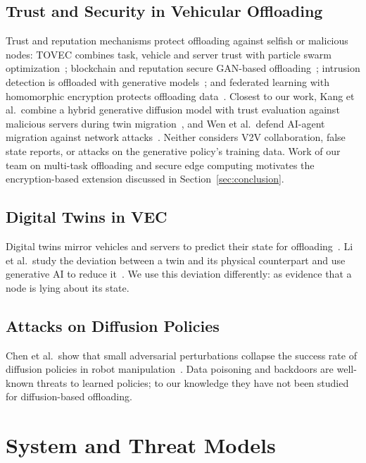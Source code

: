 \documentclass[journal]{IEEEtran}
\begin{document}
\subsection{Trust and Security in Vehicular Offloading}
Trust and reputation mechanisms protect offloading against selfish or malicious nodes: TOVEC combines task, vehicle and server trust with particle swarm optimization~\cite{huang2026tovec}; blockchain and reputation secure GAN-based offloading~\cite{S150}; intrusion detection is offloaded with generative models~\cite{S025,S123}; and federated learning with homomorphic encryption protects offloading data~\cite{wang2026craft}. Closest to our work, Kang et al.\ combine a hybrid generative diffusion model with trust evaluation against malicious servers during twin migration~\cite{S128}, and Wen et al.\ defend AI-agent migration against network attacks~\cite{S005}. Neither considers V2V collaboration, false state reports, or attacks on the generative policy's training data. Work of our team on multi-task offloading and secure edge computing \cite{chanyour2022multitask,hmimz2021biobjective,elbouabidi2026hybrid_he} motivates the encryption-based extension discussed in Section~\ref{sec:conclusion}.

\subsection{Digital Twins in VEC}
Digital twins mirror vehicles and servers to predict their state for offloading~\cite{S093,S116}. Li et al.\ study the deviation between a twin and its physical counterpart and use generative AI to reduce it~\cite{S147}. We use this deviation differently: as evidence that a node is lying about its state.

\subsection{Attacks on Diffusion Policies}
Chen et al.\ show that small adversarial perturbations collapse the success rate of diffusion policies in robot manipulation~\cite{chen2024dpa}. Data poisoning and backdoors are well-known threats to learned policies; to our knowledge they have not been studied for diffusion-based offloading.

\section{System and Threat Models}\label{sec:model}
\end{document}
